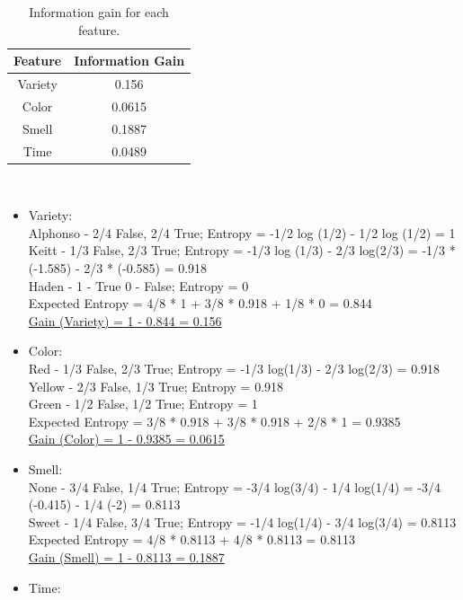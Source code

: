 \documentclass[12pt, fullpage,letterpaper]{article}
\begin{document}
\begin{enumerate}
\begin{enumerate}
\begin{table}[h]
\begin{tabular}{c|c}
        \hline
        Feature & Information Gain \\ \hline
        Variety & 0.156            \\
        Color   & 0.0615           \\
        Smell   & 0.1887           \\
        Time    & 0.0489           \\ \hline
      \end{tabular}
      \caption{Information gain for each feature.}\label{tb-entropy-ig}
    \end{table}\\
    \begin{itemize}
     \item Variety:\\
    Alphonso - 2/4 False, 2/4 True; Entropy = -1/2 log (1/2) - 1/2 log (1/2) = 1 \\
    Keitt - 1/3 False, 2/3 True; Entropy = -1/3 log (1/3) - 2/3 log(2/3) = -1/3 * (-1.585) - 2/3 * (-0.585) = 0.918 \\
    Haden - 1 - True 0 - False; Entropy = 0 \\
    Expected Entropy = 4/8 * 1 + 3/8 * 0.918 + 1/8 * 0 = 0.844\\
    \underline{Gain (Variety) = 1 - 0.844 = 0.156}\\
    \item Color:\\
    Red - 1/3 False, 2/3 True; Entropy = -1/3 log(1/3) - 2/3 log(2/3) = 0.918 \\
    Yellow - 2/3 False, 1/3 True; Entropy = 0.918\\
    Green - 1/2 False, 1/2 True; Entropy = 1\\
    Expected Entropy = 3/8 * 0.918 + 3/8 * 0.918 + 2/8 * 1 = 0.9385\\
    \underline{Gain (Color) = 1 - 0.9385 = 0.0615}\\
    \item Smell:\\
    None - 3/4 False, 1/4 True; Entropy = -3/4 log(3/4) - 1/4 log(1/4) = -3/4 (-0.415) - 1/4 (-2) = 0.8113\\
    Sweet - 1/4 False, 3/4 True; Entropy = -1/4 log(1/4) - 3/4 log(3/4) = 0.8113\\
    Expected Entropy = 4/8 * 0.8113 + 4/8 * 0.8113 = 0.8113\\
    \underline{Gain (Smell) = 1 - 0.8113 = 0.1887}\\
    \item Time: \\

\end{itemize}
\end{enumerate}
\end{enumerate}
\end{document}
